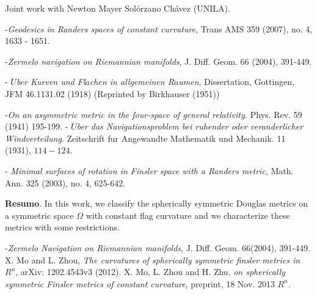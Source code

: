 	\vspace*{0.5cm} \noindent Joint work with Newton Mayer Sol\'{o}rzano Ch\'{a}vez (UNILA).

	\begin{thebibliography}{999}
		-\textit{Geodesics in Randers spaces of constant curvature}, Trans AMS {359}  (2007), no.  4, 1633 - 1651.
		
		-\textit{Zermelo navigation on Riemannian manifolds}, J. Diff. Geom. { 66} (2004), 391-449.
		
		- \textit{$\ddot U$ber Kurven und Fl$\ddot a$chen in allgemeinen R$\ddot a$umen}, Dissertation, Gottingen, JFM {46.1131.02} (1918) (Reprinted by Birkhauser (1951))
		
		 -\textit{On an asymmetric metric in the four-space of general relativity.} Phys. Rev. {59} (1941) 195-199.
		- \textit{$\ddot U$ber das Navigationsproblem bei ruhender oder veranderlicher Windverteilung}. Zeitschrift fur Angewandte Mathematik und Mechanik. {11} (1931), $114 - 124$.
		
		 - \textit{Minimal surfaces of rotation in Finsler space with a Randers metric}, Math. Ann. {325} (2003), no. 4, 625-642.
	\end{thebibliography}
	
	\vspace{24pt}

	
	
	\noindent\textbf{Resumo}.\label{nmsc} 
	In this work, we classify the spherically symmetric Douglas metrics on a symmetric space $\Omega$ with constant flag curvature and we characterize these metrics with some restrictions.

\begin{thebibliography}{999}
	-\textit{Zermelo Navigation on Riemannian manifolds}, J. Diff. Geom. 66(2004), 391-449.
	 X. Mo and L. Zhou, {\em The curvatures of spherically symmetric finsler metrics in $R^n$}, arXiv: 1202.4543v3 (2012). 
	 X. Mo, L. Zhou and H. Zhu, {\em on spherically symmetric Finsler metrics of constant curvature}, preprint, 18 Nov. 2013 $R^n$.
\end{thebibliography}
	\vspace{24pt}


